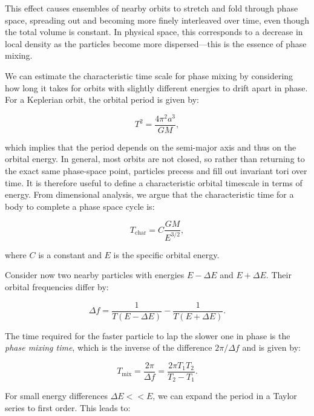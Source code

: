         This effect causes ensembles of nearby orbits to stretch and fold through phase space, spreading out and becoming more finely interleaved over time, even though the total volume is constant. In physical space, this corresponds to a decrease in local density as the particles become more dispersed—this is the essence of phase mixing.

        We can estimate the characteristic time scale for phase mixing by considering how long it takes for orbits with slightly different energies to drift apart in phase. For a Keplerian orbit, the orbital period is given by:

        \begin{equation}
        T^2 = \frac{4\pi^2 a^3}{GM},
        \end{equation}

        which implies that the period depends on the semi-major axis and thus on the orbital energy. In general, most orbits are not closed, so rather than returning to the exact same phase-space point, particles precess and fill out invariant tori over time. It is therefore useful to define a characteristic orbital timescale in terms of energy. From dimensional analysis, we argue that the characteristic time for a body to complete a phase space cycle is:

        \begin{equation}
        T_\mathrm{char} = C \frac{GM}{E^{3/2}},
        \end{equation}

        where $ C$ is a constant and $E$ is the specific orbital energy.

        Consider now two nearby particles with energies $E - \Delta E$ and $ E + \Delta E $. Their orbital frequencies differ by:

        \begin{equation}
        \Delta f = \frac{1}{T( E - \Delta E)} - \frac{1}{T(E + \Delta E)}.
        \end{equation}

        The time required for the faster particle to lap the slower one in phase is the \textit{phase mixing time}, which is the inverse of the difference $2\pi / \Delta f$ and is given by:

        \begin{equation}
        T_\mathrm{mix} = \frac{2\pi}{\Delta f} = \frac{2\pi T_1 T_2}{T_2 - T_1}.
        \end{equation}

        For small energy differences \( \Delta E << E \), we can expand the period in a Taylor series to first order. This leads to:

